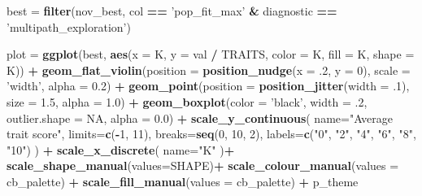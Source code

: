 \documentclass[]{book}
\newenvironment{Shaded}{\begin{snugshade}}{\end{snugshade}}
\newcommand{\DataTypeTok}[1]{\textcolor[rgb]{0.13,0.29,0.53}{#1}}
\newcommand{\DecValTok}[1]{\textcolor[rgb]{0.00,0.00,0.81}{#1}}
\newcommand{\FloatTok}[1]{\textcolor[rgb]{0.00,0.00,0.81}{#1}}
\newcommand{\KeywordTok}[1]{\textcolor[rgb]{0.13,0.29,0.53}{\textbf{#1}}}
\newcommand{\NormalTok}[1]{#1}
\newcommand{\OperatorTok}[1]{\textcolor[rgb]{0.81,0.36,0.00}{\textbf{#1}}}
\newcommand{\OtherTok}[1]{\textcolor[rgb]{0.56,0.35,0.01}{#1}}
\newcommand{\StringTok}[1]{\textcolor[rgb]{0.31,0.60,0.02}{#1}}
\begin{document}
\begin{Shaded}
\begin{Highlighting}[]
\NormalTok{best =}\StringTok{ }\KeywordTok{filter}\NormalTok{(nov_best, col }\OperatorTok{==}\StringTok{ 'pop_fit_max'} \OperatorTok{&}\StringTok{ }\NormalTok{diagnostic }\OperatorTok{==}\StringTok{ 'multipath_exploration'}\NormalTok{)}

\NormalTok{plot =}\StringTok{ }\KeywordTok{ggplot}\NormalTok{(best, }\KeywordTok{aes}\NormalTok{(}\DataTypeTok{x =}\NormalTok{ K, }\DataTypeTok{y =}\NormalTok{ val }\OperatorTok{/}\StringTok{ }\NormalTok{TRAITS, }\DataTypeTok{color =}\NormalTok{ K, }\DataTypeTok{fill =}\NormalTok{ K, }\DataTypeTok{shape =}\NormalTok{ K)) }\OperatorTok{+}
\StringTok{  }\KeywordTok{geom_flat_violin}\NormalTok{(}\DataTypeTok{position =} \KeywordTok{position_nudge}\NormalTok{(}\DataTypeTok{x =} \FloatTok{.2}\NormalTok{, }\DataTypeTok{y =} \DecValTok{0}\NormalTok{), }\DataTypeTok{scale =} \StringTok{'width'}\NormalTok{, }\DataTypeTok{alpha =} \FloatTok{0.2}\NormalTok{) }\OperatorTok{+}
\StringTok{  }\KeywordTok{geom_point}\NormalTok{(}\DataTypeTok{position =} \KeywordTok{position_jitter}\NormalTok{(}\DataTypeTok{width =} \FloatTok{.1}\NormalTok{), }\DataTypeTok{size =} \FloatTok{1.5}\NormalTok{, }\DataTypeTok{alpha =} \FloatTok{1.0}\NormalTok{) }\OperatorTok{+}
\StringTok{  }\KeywordTok{geom_boxplot}\NormalTok{(}\DataTypeTok{color =} \StringTok{'black'}\NormalTok{, }\DataTypeTok{width =} \FloatTok{.2}\NormalTok{, }\DataTypeTok{outlier.shape =} \OtherTok{NA}\NormalTok{, }\DataTypeTok{alpha =} \FloatTok{0.0}\NormalTok{) }\OperatorTok{+}
\StringTok{  }\KeywordTok{scale_y_continuous}\NormalTok{(}
    \DataTypeTok{name=}\StringTok{"Average trait score"}\NormalTok{,}
    \DataTypeTok{limits=}\KeywordTok{c}\NormalTok{(}\OperatorTok{-}\DecValTok{1}\NormalTok{, }\DecValTok{11}\NormalTok{),}
    \DataTypeTok{breaks=}\KeywordTok{seq}\NormalTok{(}\DecValTok{0}\NormalTok{, }\DecValTok{10}\NormalTok{, }\DecValTok{2}\NormalTok{),}
    \DataTypeTok{labels=}\KeywordTok{c}\NormalTok{(}\StringTok{"0"}\NormalTok{, }\StringTok{"2"}\NormalTok{, }\StringTok{"4"}\NormalTok{, }\StringTok{"6"}\NormalTok{, }\StringTok{"8"}\NormalTok{, }\StringTok{"10"}\NormalTok{)}
\NormalTok{  ) }\OperatorTok{+}
\StringTok{  }\KeywordTok{scale_x_discrete}\NormalTok{(}
    \DataTypeTok{name=}\StringTok{"K"}
\NormalTok{  )}\OperatorTok{+}
\StringTok{  }\KeywordTok{scale_shape_manual}\NormalTok{(}\DataTypeTok{values=}\NormalTok{SHAPE)}\OperatorTok{+}
\StringTok{  }\KeywordTok{scale_colour_manual}\NormalTok{(}\DataTypeTok{values =}\NormalTok{ cb_palette) }\OperatorTok{+}
\StringTok{  }\KeywordTok{scale_fill_manual}\NormalTok{(}\DataTypeTok{values =}\NormalTok{ cb_palette) }\OperatorTok{+}
\StringTok{  }\NormalTok{p_theme}


\end{Highlighting}
\end{Shaded}
\end{document}
